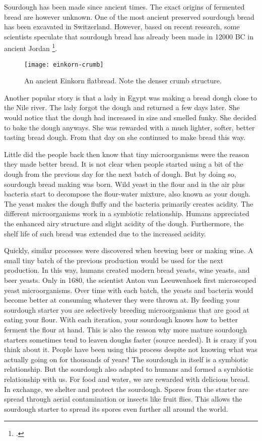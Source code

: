 Sourdough has been made since ancient times. The exact origins
of fermented bread are however unknown. One of the most ancient
preserved sourdough bread has been excavated in Switzerland.
However, based on recent research, some scientists speculate
that sourdough bread has already been made in 12000 BC in ancient
Jordan \footcite{jordan+bread}.

\begin{figure}[h]
  \texttt{[image: einkorn-crumb]}
  \caption{An ancient Einkorn flatbread. Note the denser crumb structure.}
  \label{einkorn-crumb}
\end{figure}

Another popular story is that a lady in Egypt was making
a bread dough close to the Nile river. The lady forgot the
dough and returned a few days later. She would notice that
the dough had increased in size and smelled funky. She decided
to bake the dough anyways. She was rewarded with a much
lighter, softer, better tasting bread dough. From that day
on she continued to make bread this way.

Little did the people back then know that tiny microorganisms
were the reason they made better bread. It is not clear when
people started using a bit of the dough from the previous
day for the next batch of dough. But by doing so, sourdough
bread making was born. Wild yeast in the flour and in the air
plus bacteria start to decompose the flour-water mixture, also
known as your dough. The yeast makes the dough fluffy and
the bacteria primarily creates acidity. The different
microorganisms work in a symbiotic relationship. Humans
appreciated the enhanced airy structure and slight acidity
of the dough. Furthermore, the shelf life of such bread
was extended due to the increased acidity. 

Quickly, similar processes were discovered when brewing beer
or making wine. A small tiny batch of the previous production
would be used for the next production. In this way, humans created
modern bread yeasts, wine yeasts, and beer yeasts. Only in 1680,
the scientist Anton van Leeuwenhoek first microscoped yeast
microorganisms. Over time with each batch, the yeasts and bacteria
would become better at consuming whatever they were thrown at.
By feeding your sourdough starter you are selectively breeding
microorganisms that are good at eating your flour. With
each iteration, your sourdough knows how to better ferment the flour
at hand. This is also the reason why more mature sourdough starters sometimes
tend to leaven doughs faster (source needed). It is crazy if you
think about it. People have been using this process despite not
knowing what was actually going on for thousands of years! The
sourdough in itself is a symbiotic relationship. But the sourdough
also adapted to humans and formed a symbiotic relationship with us.
For food and water, we are rewarded with delicious bread. In exchange,
we shelter and protect the sourdough. Spores from the starter
are spread through aerial contamination or insects like fruit flies.
This allows the sourdough starter to spread its spores even
further all around the world. 

